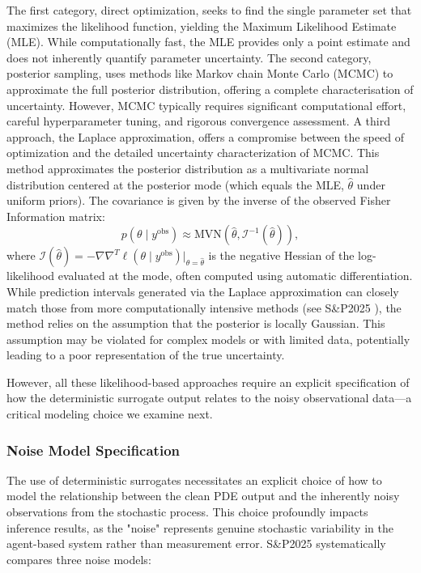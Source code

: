 \documentclass{article}
\newcommand{\SP}{S\&P2025 }
\begin{document}
The first category, direct optimization, seeks to find the single parameter set that maximizes the likelihood function, yielding the Maximum Likelihood Estimate (MLE). While computationally fast, the MLE provides only a point estimate and does not inherently quantify parameter uncertainty. The second category, posterior sampling, uses methods like Markov chain Monte Carlo (MCMC) to approximate the full posterior distribution, offering a complete characterisation of uncertainty. However, MCMC typically requires significant computational effort, careful hyperparameter tuning, and rigorous convergence assessment. A third approach, the Laplace approximation, offers a compromise between the speed of optimization and the detailed uncertainty characterization of MCMC. This method approximates the posterior distribution as a multivariate normal distribution centered at the posterior mode (which equals the MLE, $\hat{\theta}$ under uniform priors). The covariance is given by the inverse of the observed Fisher Information matrix:
\begin{equation}
	p(\theta \mid y^{\text{obs}}) \approx \text{MVN}(\hat{\theta}, \mathcal{I}^{-1}(\hat{\theta})),
\end{equation}
where $\mathcal{I}(\hat{\theta}) = -\nabla\nabla^T \ell(\theta \mid y^{\text{obs}})|_{\theta=\hat{\theta}}$ is the negative Hessian of the log-likelihood evaluated at the mode, often computed using automatic differentiation. While prediction intervals generated via the Laplace approximation can closely match those from more computationally intensive methods (see \SP), the method relies on the assumption that the posterior is locally Gaussian. This assumption may be violated for complex models or with limited data, potentially leading to a poor representation of the true uncertainty. 

However, all these likelihood-based approaches require an explicit specification of how the deterministic surrogate output relates to the noisy observational data—a critical modeling choice we examine next.


\subsubsection{Noise Model Specification}\label{sec:noise_model}

The use of deterministic surrogates necessitates an explicit choice of how to model the relationship between the clean PDE output and the inherently noisy observations from the stochastic process. This choice profoundly impacts inference results, as the "noise" represents genuine stochastic variability in the agent-based system rather than measurement error. S\&P2025 systematically compares three noise models:
\end{document}
